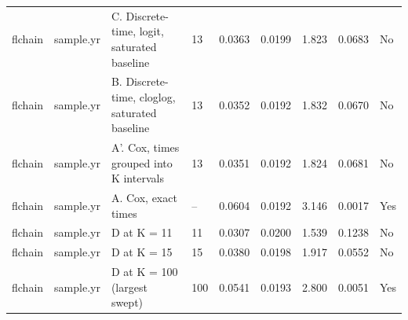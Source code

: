 \begin{tabular}{lllllllll}
  flchain & sample.yr & C. Discrete-time, logit, saturated baseline & 13 & 0.0363 & 0.0199 & 1.823 & 0.0683 & No \\ 
  flchain & sample.yr & B. Discrete-time, cloglog, saturated baseline & 13 & 0.0352 & 0.0192 & 1.832 & 0.0670 & No \\ 
  flchain & sample.yr & A'. Cox, times grouped into K intervals & 13 & 0.0351 & 0.0192 & 1.824 & 0.0681 & No \\ 
  flchain & sample.yr & A. Cox, exact times & -- & 0.0604 & 0.0192 & 3.146 & 0.0017 & Yes \\ 
  flchain & sample.yr & D at K = 11 & 11 & 0.0307 & 0.0200 & 1.539 & 0.1238 & No \\ 
  flchain & sample.yr & D at K = 15 & 15 & 0.0380 & 0.0198 & 1.917 & 0.0552 & No \\ 
  flchain & sample.yr & D at K = 100 (largest swept) & 100 & 0.0541 & 0.0193 & 2.800 & 0.0051 & Yes \\ 
   \bottomrule
\end{tabular}
